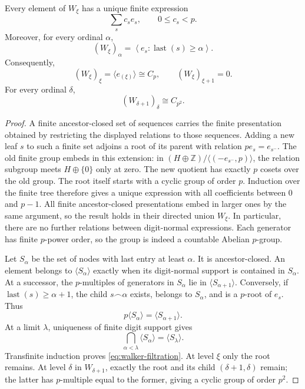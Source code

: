 \documentclass[11pt]{article}
\begin{document}
\begin{lemma}\label{lem:walker-filtration}
Every element of $W_\xi$ has a unique finite expression
\[
 \sum_s c_s e_s,\qquad 0\le c_s<p.
\]
Moreover, for every ordinal $\alpha$,
\begin{equation}\label{eq:walker-filtration}
 (W_\xi)_\alpha
 =\left\langle e_s:\operatorname{last}(s)\ge\alpha\right\rangle.
\end{equation}
Consequently,
\[
 (W_\xi)_\xi=\langle e_{(\xi)}\rangle\cong C_p,
 \qquad (W_\xi)_{\xi+1}=0.
\]
For every ordinal $\delta$,
\[
 (W_{\delta+1})_\delta\cong C_{p^2}.
\]
\end{lemma}

\begin{proof}
A finite ancestor-closed set of sequences carries the finite
presentation obtained by restricting the displayed relations to those
sequences. Adding a new leaf $s$ to such a finite set adjoins a root of
its parent with relation $pe_s=e_{s^-}$. The old finite group embeds in
this extension: in
\((H\oplus\mathbb Z)/\langle(-e_{s^-},p)\rangle\), the relation subgroup
meets $H\oplus\{0\}$ only at zero. The new quotient has exactly $p$
cosets over the old group. The root itself starts with a cyclic group
of order $p$. Induction over the finite tree therefore gives a unique
expression with all coefficients between $0$ and $p-1$.
All finite ancestor-closed presentations embed in larger ones by the
same argument, so the result holds in their directed union $W_\xi$.
In particular, there are no further relations between digit-normal
expressions. Each generator has finite $p$-power order, so the group is
indeed a countable Abelian $p$-group.

Let $S_\alpha$ be the set of nodes with last entry at least $\alpha$.
It is ancestor-closed. An element belongs to $\langle S_\alpha\rangle$
exactly when its digit-normal support is contained in $S_\alpha$.
At a successor, the $p$-multiples of generators in $S_\alpha$ lie in
$\langle S_{\alpha+1}\rangle$. Conversely, if
$\operatorname{last}(s)\ge\alpha+1$, the child
$s\mathbin{\smallfrown}\alpha$ exists, belongs to $S_\alpha$, and is
a $p$-root of $e_s$. Thus
\[
 p\langle S_\alpha\rangle=\langle S_{\alpha+1}\rangle.
\]
At a limit $\lambda$, uniqueness of finite digit support gives
\[
 \bigcap_{\alpha<\lambda}\langle S_\alpha\rangle
 =\langle S_\lambda\rangle.
\]
Transfinite induction proves \eqref{eq:walker-filtration}.
At level $\xi$ only the root remains. At level $\delta$ in
$W_{\delta+1}$, exactly the root and its child $(\delta+1,\delta)$
remain; the latter has $p$-multiple equal to the former, giving a
cyclic group of order $p^2$.
\end{proof}
\end{document}

